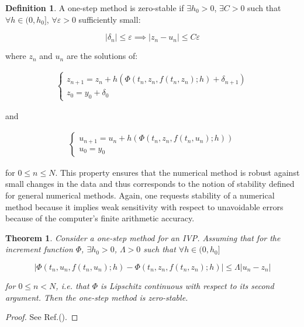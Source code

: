 \documentclass[11pt]{article}
\theoremstyle{theorem}
\newtheorem{theorem}{Theorem}
\theoremstyle{definition}
\newtheorem{definition}{Definition}
\begin{document}
\begin{definition}
	\label{def:zero-stability-one-step}
	A one-step method is zero-stable if $\exists h_0>0$, $\exists C>0$ such that $\forall h\in (0, h_0]$, $\forall\varepsilon>0$ sufficiently small:
	
	$$|\delta_n|\le\varepsilon\implies |z_n-u_n|\le C\varepsilon$$
	
	where $z_n$ and $u_n$ are the solutions of:
	
	\begin{align*}
	\begin{cases}
	z_{n+1}=z_n+h\left(\Phi(t_n, z_n, f(t_n, z_n);h)+\delta_{n+1}\right)\\
	z_0=y_0+\delta_0
	\end{cases}
	\end{align*}
	
	and 
	
	\begin{align*}
	\begin{cases}
	u_{n+1}=u_n+h\left(\Phi(t_n, z_n, f(t_n, u_n);h)\right)\\
	u_0=y_0
	\end{cases}
	\end{align*}
	
	for $0\le n\le N$.
	This property ensures that the numerical method is robust against small changes in
	the data and thus corresponds to the notion of stability defined for general numerical methods. Again, one requests stability of a numerical method because it implies weak sensitivity with respect to unavoidable errors because of the computer’s finite arithmetic accuracy.
\end{definition}

\begin{theorem}
	\label{thm:zero-stability}
	Consider a one-step method for an IVP. Assuming that for the increment function $\Phi$, $\exists h_0>0$, $\Lambda>0$ such that $\forall h\in(0, h_0]$
	
	
	$$|\Phi(t_n, u_n, f(t_n, u_n);h)-\Phi(t_n, z_n,f(t_n, z_n);h)|\le\Lambda|u_n-z_n|$$
	
	for $0\le n< N$, i.e. that $\Phi$ is Lipschitz continuous with respect to its second argument. Then the one-step method is zero-stable.\\
\end{theorem}

\begin{proof}
	See Ref.(\cite{lec-notes}).
\end{proof}
\end{document}
